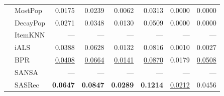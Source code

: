\documentclass[sigconf,authorversion,nonacm]{acmart}
\begin{document}
\begin{table}
\begin{tabular}{llrrrrrr}
    & MostPop & 0.0175 & 0.0239 & 0.0062 & 0.0313 & 0.0000 & 0.0000 \\
    & DecayPop & 0.0271 & 0.0348 & 0.0130 & 0.0509 & 0.0000 & 0.0000 \\
    & ItemKNN & --- & --- & --- & --- & --- & --- \\
    & iALS & 0.0388 & 0.0628 & 0.0132 & 0.0816 & 0.0010 & 0.0027 \\
    & BPR & \underline{0.0408} & \underline{0.0664} & \underline{0.0141} & \underline{0.0870} & 0.0179 & \underline{0.0508} \\
    & SANSA & --- & --- & --- & --- & --- & --- \\
    & SASRec & \textbf{0.0647} & \textbf{0.0847} & \textbf{0.0289} & \textbf{0.1214} & \underline{0.0212} & 0.0456 \\
    \bottomrule
  \end{tabular}
\end{table}
\end{document}
